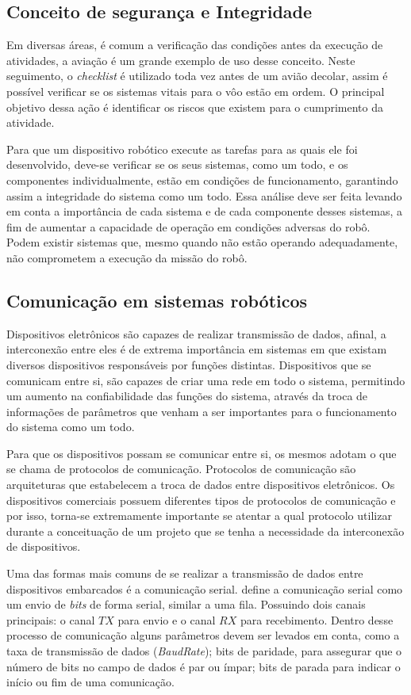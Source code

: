 \subsection{Conceito de segurança e Integridade}\label{sec:segur_inte}
Em diversas áreas, é comum a verificação das condições antes da execução de atividades, a aviação é um grande exemplo de uso desse conceito. Neste seguimento, o \textit{checklist} é utilizado toda vez antes de um avião decolar, assim é possível verificar se os sistemas vitais para o vôo estão em ordem. O principal objetivo dessa ação é identificar os riscos que existem para o cumprimento da atividade.

Para que um dispositivo robótico execute as tarefas para as quais ele foi desenvolvido, deve-se verificar se os seus sistemas, como um todo, e os componentes individualmente, estão em condições de funcionamento, garantindo assim a integridade do sistema como um todo. Essa análise deve ser feita levando em conta a importância de cada sistema e de cada componente desses sistemas, a fim de aumentar a capacidade de operação em condições adversas do robô. Podem existir sistemas que, mesmo quando não estão operando adequadamente, não comprometem a execução da missão do robô.

\subsection{Comunicação em sistemas robóticos}\label{sec:comm_sis}
Dispositivos eletrônicos são capazes de realizar transmissão de dados, afinal, a interconexão entre eles é de extrema importância em sistemas em que existam diversos dispositivos responsáveis por funções distintas. Dispositivos que se comunicam entre si, são capazes de criar uma rede em todo o sistema, permitindo um aumento na confiabilidade das funções do sistema, através da troca de informações de parâmetros que venham a ser importantes para o funcionamento do sistema como um todo.

Para que os dispositivos possam se comunicar entre si, os mesmos adotam o que se chama de protocolos de comunicação. Protocolos de comunicação são arquiteturas que estabelecem a troca de dados entre dispositivos eletrônicos. Os dispositivos comerciais possuem diferentes tipos de protocolos de comunicação e por isso, torna-se extremamente importante se atentar a qual protocolo utilizar durante a conceituação de um projeto que se tenha a necessidade da interconexão de dispositivos.

Uma das formas mais comuns de se realizar a transmissão de dados entre dispositivos embarcados é a comunicação serial. \cite{livro_sistemas_embarcados} define a comunicação serial como um envio de \textit{bits} de forma serial, similar a uma fila. Possuindo dois canais principais: o canal $TX$ para envio e o canal $RX$ para recebimento. Dentro desse processo de comunicação alguns parâmetros devem ser levados em conta, como a taxa de transmissão de dados (\textit{BaudRate}); bits de paridade, para assegurar que o número de bits no campo de dados é par ou ímpar; bits de parada para indicar o início ou fim de uma comunicação.

